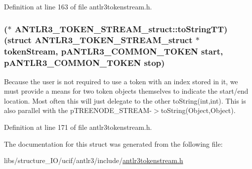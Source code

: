 Definition at line 163 of file antlr3tokenstream.\-h.

\hypertarget{struct_a_n_t_l_r3___t_o_k_e_n___s_t_r_e_a_m__struct_a527ad3a8a12fcadbe450119cf5ed9c8d}{
\subsubsection[{to\-String\-T\-T}]{($\ast$ A\-N\-T\-L\-R3\-\_\-\-T\-O\-K\-E\-N\-\_\-\-S\-T\-R\-E\-A\-M\-\_\-struct\-::to\-String\-T\-T)(struct {\bf A\-N\-T\-L\-R3\-\_\-\-T\-O\-K\-E\-N\-\_\-\-S\-T\-R\-E\-A\-M\-\_\-struct} $\ast$token\-Stream, {\bf p\-A\-N\-T\-L\-R3\-\_\-\-C\-O\-M\-M\-O\-N\-\_\-\-T\-O\-K\-E\-N} start, {\bf p\-A\-N\-T\-L\-R3\-\_\-\-C\-O\-M\-M\-O\-N\-\_\-\-T\-O\-K\-E\-N} stop)}}\label{struct_a_n_t_l_r3___t_o_k_e_n___s_t_r_e_a_m__struct_a527ad3a8a12fcadbe450119cf5ed9c8d}
Because the user is not required to use a token with an index stored in it, we must provide a means for two token objects themselves to indicate the start/end location. Most often this will just delegate to the other to\-String(int,int). This is also parallel with the p\-T\-R\-E\-E\-N\-O\-D\-E\-\_\-\-S\-T\-R\-E\-A\-M-\/$>$to\-String(\-Object,\-Object). 

Definition at line 171 of file antlr3tokenstream.\-h.



The documentation for this struct was generated from the following file\-:\begin{DoxyCompactItemize}
\item 
libs/structure\-\_\-\-I\-O/ucif/antlr3/include/\hyperlink{antlr3tokenstream_8h}{antlr3tokenstream.\-h}\end{DoxyCompactItemize}
